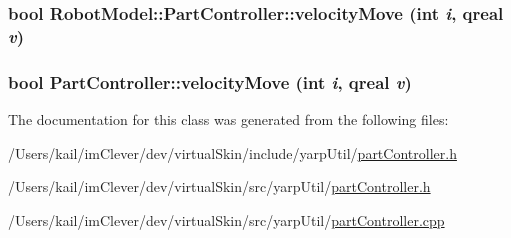 \label{class_robot_model_1_1_part_controller_aeb479f7ffd70c0cf80beabf38b1073f7}
\hypertarget{class_robot_model_1_1_part_controller_a8ac6b4519903ab433a7474e0491333f3}{
\subsubsection[{velocityMove}]{\setlength{\rightskip}{0pt plus 5cm}bool RobotModel::PartController::velocityMove (int {\em i}, \/  qreal {\em v})}}
\label{class_robot_model_1_1_part_controller_a8ac6b4519903ab433a7474e0491333f3}
\hypertarget{class_robot_model_1_1_part_controller_ac5476493b51412c7b6008cf58111543b}{
\subsubsection[{velocityMove}]{\setlength{\rightskip}{0pt plus 5cm}bool PartController::velocityMove (int {\em i}, \/  qreal {\em v})}}
\label{class_robot_model_1_1_part_controller_ac5476493b51412c7b6008cf58111543b}


The documentation for this class was generated from the following files:\begin{DoxyCompactItemize}
\item 
/Users/kail/imClever/dev/virtualSkin/include/yarpUtil/\hyperlink{include_2yarp_util_2part_controller_8h}{partController.h}\item 
/Users/kail/imClever/dev/virtualSkin/src/yarpUtil/\hyperlink{src_2yarp_util_2part_controller_8h}{partController.h}\item 
/Users/kail/imClever/dev/virtualSkin/src/yarpUtil/\hyperlink{part_controller_8cpp}{partController.cpp}\end{DoxyCompactItemize}

